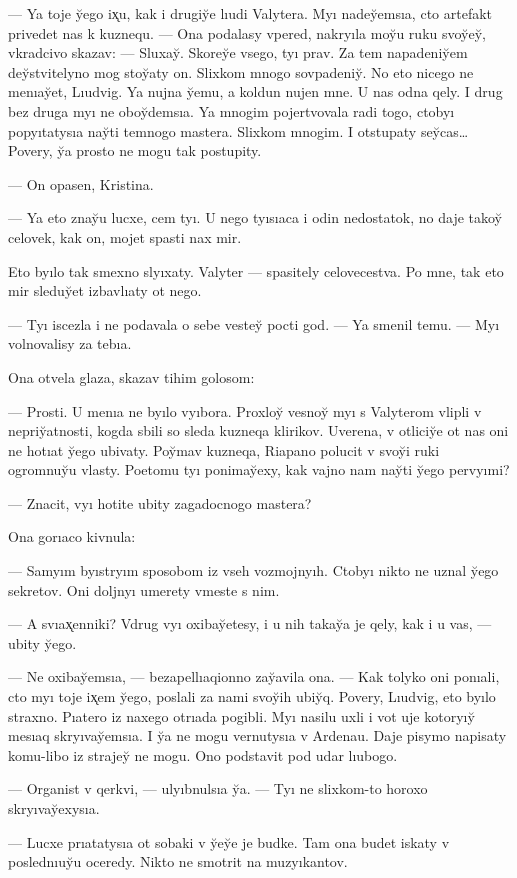 \documentclass[10pt]{book}
\begin{document}
— Ya toje y̆ego ix̨u, kak i drugiy̆e lıudi Valytera. Myı nadey̆emsıa, cto artefakt privedet nas k kuznequ. — Ona podalasy vpered, nakryıla moy̆u ruku svoy̆ey̆, vkradcivo skazav: — Sluxay̆. Skorey̆e vsego, tyı prav. Za tem napadeniy̆em dey̆stvitelyno mog stoy̆aty on. Slixkom mnogo sovpadeniy̆. No eto nicego ne menıay̆et, Lıudvig. Ya nujna y̆emu, a koldun nujen mne. U nas odna qely. I drug bez druga myı ne oboy̆demsıa. Ya mnogim pojertvovala radi togo, ctobyı popyıtatysıa nay̆ti temnogo mastera. Slixkom mnogim. I otstupaty sey̆cas… Povery, y̆a prosto ne mogu tak postupity.

— On opasen, Kristina.

— Ya eto znay̆u lucxe, cem tyı. U nego tyısıaca i odin nedostatok, no daje takoy̆ celovek, kak on, mojet spasti nax mir.

Eto byılo tak smexno slyıxaty. Valyter — spasitely celovecestva. Po mne, tak eto mir sleduy̆et izbavlıaty ot nego.

— Tyı iscezla i ne podavala o sebe vestey̆ pocti god. — Ya smenil temu. — Myı volnovalisy za tebıa.

Ona otvela glaza, skazav tihim golosom:

— Prosti. U menıa ne byılo vyıbora. Proxloy̆ vesnoy̆ myı s Valyterom vlipli v nepriy̆atnosti, kogda sbili so sleda kuzneqa klirikov. Uverena, v otliciy̆e ot nas oni ne hotıat y̆ego ubivaty. Poy̆mav kuzneqa, Riapano polucit v svoy̆i ruki ogromnuy̆u vlasty. Poetomu tyı ponimay̆exy, kak vajno nam nay̆ti y̆ego pervyımi?

— Znacit, vyı hotite ubity zagadocnogo mastera?

Ona gorıaco kivnula:

— Samyım byıstryım sposobom iz vseh vozmojnyıh. Ctobyı nikto ne uznal y̆ego sekretov. Oni doljnyı umerety vmeste s nim.

— A svıax̨enniki? Vdrug vyı oxibay̆etesy, i u nih takay̆a je qely, kak i u vas, — ubity y̆ego.

— Ne oxibay̆emsıa, — bezapellıaqionno zay̆avila ona. — Kak tolyko oni ponıali, cto myı toje ix̨em y̆ego, poslali za nami svoy̆ih ubiy̆q. Povery, Lıudvig, eto byılo straxno. Pıatero iz naxego otrıada pogibli. Myı nasilu uxli i vot uje kotoryıy̆ mesıaq skryıvay̆emsıa. I y̆a ne mogu vernutysıa v Ardenau. Daje pisymo napisaty komu-libo iz strajey̆ ne mogu. Ono podstavit pod udar lıubogo.

— Organist v qerkvi, — ulyıbnulsıa y̆a. — Tyı ne slixkom-to horoxo skryıvay̆exysıa.

— Lucxe prıatatysıa ot sobaki v y̆ey̆e je budke. Tam ona budet iskaty v poslednıuy̆u oceredy. Nikto ne smotrit na muzyıkantov.
\end{document}
